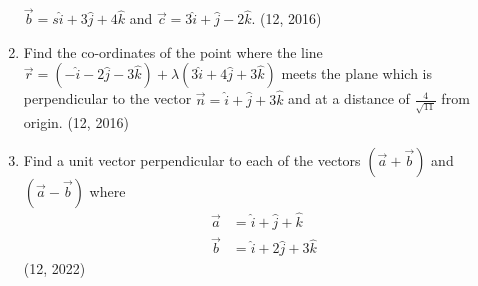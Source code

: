 \begin{enumerate}[label=\thesubsection.\arabic*,ref=\thesubsection.\theenumi]
      $\overrightarrow{b} = s\hat{i} +3\hat{j}+4\hat{k}$ and $\overrightarrow{c}=3\hat{i} +\hat{j}-2\hat{k}$. \hfill (12, 2016)
\item Find the co-ordinates of the point where the line $\overrightarrow{r}=(-\hat{i}-2\hat{j}-3\hat{k})+\lambda(3\hat{i} +4\hat{j}+3\hat{k})$ meets the plane which is perpendicular to the vector $\overrightarrow{n}=\hat{i}+\hat{j} +3\hat{k}$ and at a distance of
      $\frac{4}{\sqrt{11}}$ from origin. \hfill (12, 2016)
\item Find a unit vector perpendicular to each of the vectors $(\vec{a}+\vec{b})$ and $(\vec{a}-\vec{b})$ where 
\begin{align}
	\vec{a}&=\hat{i}+\hat{j}+\hat{k}\\
	\vec{b}&=\hat{i}+2\hat{j}+3\hat{k}
\end{align}
\hfill (12, 2022)
\end{enumerate}
